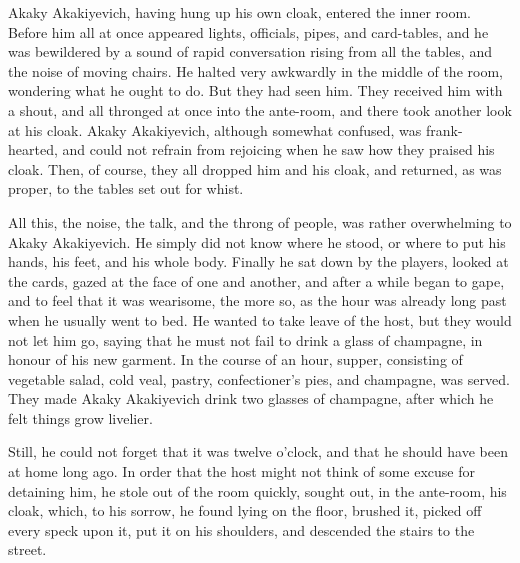Akaky Akakiyevich, having hung up his own cloak, entered the inner
room. Before him all at once appeared lights, officials, pipes, and
card-tables, and he was bewildered by a sound of rapid conversation
rising from all the tables, and the noise of moving chairs. He halted
very awkwardly in the middle of the room, wondering what he ought to
do. But they had seen him. They received him with a shout, and all
thronged at once into the ante-room, and there took another look at
his cloak. Akaky Akakiyevich, although somewhat confused, was
frank-hearted, and could not refrain from rejoicing when he saw how
they praised his cloak. Then, of course, they all dropped him and his
cloak, and returned, as was proper, to the tables set out for whist.

All this, the noise, the talk, and the throng of people, was rather
overwhelming to Akaky Akakiyevich. He simply did not know where he
stood, or where to put his hands, his feet, and his whole body.
Finally he sat down by the players, looked at the cards, gazed at the
face of one and another, and after a while began to gape, and to feel
that it was wearisome, the more so, as the hour was already long past
when he usually went to bed. He wanted to take leave of the host, but
they would not let him go, saying that he must not fail to drink a
glass of champagne, in honour of his new garment. In the course of an
hour, supper, consisting of vegetable salad, cold veal, pastry,
confectioner's pies, and champagne, was served. They made Akaky
Akakiyevich drink two glasses of champagne, after which he felt things
grow livelier.

Still, he could not forget that it was twelve o'clock, and that he
should have been at home long ago. In order that the host might not
think of some excuse for detaining him, he stole out of the room
quickly, sought out, in the ante-room, his cloak, which, to his
sorrow, he found lying on the floor, brushed it, picked off every
speck upon it, put it on his shoulders, and descended the stairs to
the street.

